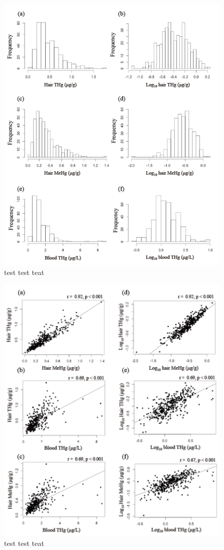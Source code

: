 \begin{figure}
  \centering
    \label{fig:Fig28}
  \includegraphics[scale=1]{Figures/Fig28.pdf}
  \caption[test caption]{test test teat}
\end{figure}

\begin{figure}
  \centering
    \label{fig:Fig29}
  \includegraphics[scale=1]{Figures/Fig29.pdf}
  \caption[test caption]{test test teat}
\end{figure}


